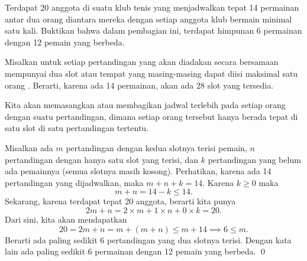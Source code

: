 \documentclass[12pt]{scrartcl}
\begin{document}
	\begin{soaljawab} Terdapat 20 anggota di suatu klub tenis yang menjadwalkan tepat 14 permainan antar dua orang diantara mereka dengan setiap anggota klub bermain minimal satu kali. Buktikan bahwa dalam pembagian ini, terdapat himpunan 6 permainan dengan 12 pemain yang berbeda.\\
	
	\begin{solusi}
		Misalkan untuk setiap pertandingan yang akan diadakan secara bersamaan mempunyai dua slot atau tempat yang masing-masing dapat diisi maksimal satu orang . Berarti, karena ada 14 permainan, akan ada 28 slot yang tersedia.
		
		Kita akan memasangkan atau membagikan jadwal terlebih pada setiap orang dengan suatu pertandingan, dimana setiap orang tersebut hanya berada tepat di satu slot di satu pertandingan tertentu. 
		
		
		 Misalkan ada $m$ pertandingan dengan kedua slotnya terisi pemain, $n$ pertandingan dengan hanya satu slot yang terisi, dan $k$ pertandingan yang belum ada pemainnya (semua slotnya masih kosong). Perhatikan, karena ada 14 pertandingan yang dijadwalkan, maka $m+n+k=14$. Karena $k \ge 0$ maka $$m+n=14-k \le 14.$$
		 Sekarang, karena terdapat tepat 20 anggota, berarti kita punya $$2m+n=2\times m+1 \times n+0 \times k =20.$$ Dari sini, kita akan mendapatkan $$20=2m+n=m+(m+n) \le m + 14 \implies 6 \le m.$$ Berarti ada paling sedikit 6 pertandingan yang dua slotnya terisi. Dengan kata lain ada paling sedikit 6 permainan dengan 12 pemain yang berbeda. \qed
	\end{solusi}
	\end{soaljawab}
	
\end{document}
